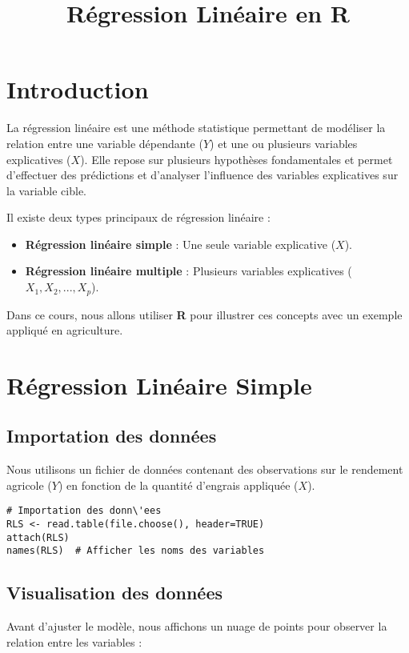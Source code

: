 \documentclass{article}
\title{R\'egression Lin\'eaire en R}
\author{}
\date{}
\begin{document}
\maketitle

\section{Introduction}
La r\'egression lin\'eaire est une m\'ethode statistique permettant de mod\'eliser la relation entre une variable d\'ependante ($Y$) et une ou plusieurs variables explicatives ($X$). Elle repose sur plusieurs hypoth\`eses fondamentales et permet d'effectuer des pr\'edictions et d'analyser l'influence des variables explicatives sur la variable cible.

Il existe deux types principaux de r\'egression lin\'eaire :
\begin{itemize}
    \item \textbf{R\'egression lin\'eaire simple} : Une seule variable explicative ($X$).
    \item \textbf{R\'egression lin\'eaire multiple} : Plusieurs variables explicatives ($X_1, X_2, ..., X_p$).
\end{itemize}

Dans ce cours, nous allons utiliser \textbf{R} pour illustrer ces concepts avec un exemple appliqu\'e en agriculture.

\section{R\'egression Lin\'eaire Simple}
\subsection{Importation des donn\'ees}
Nous utilisons un fichier de donn\'ees contenant des observations sur le rendement agricole ($Y$) en fonction de la quantit\'e d'engrais appliqu\'ee ($X$).

\begin{verbatim}
# Importation des donn\'ees
RLS <- read.table(file.choose(), header=TRUE)
attach(RLS)
names(RLS)  # Afficher les noms des variables
\end{verbatim}

\subsection{Visualisation des donn\'ees}
Avant d'ajuster le mod\`ele, nous affichons un nuage de points pour observer la relation entre les variables :
\end{document}
